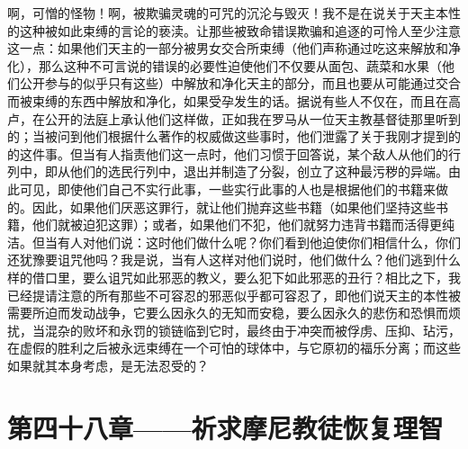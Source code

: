啊，可憎的怪物！啊，被欺骗灵魂的可咒的沉沦与毁灭！我不是在说关于天主本性的这种被如此束缚的言论的亵渎。让那些被致命错误欺骗和追逐的可怜人至少注意这一点：如果他们天主的一部分被男女交合所束缚（他们声称通过吃这来解放和净化），那么这种不可言说的错误的必要性迫使他们不仅要从面包、蔬菜和水果（他们公开参与的似乎只有这些）中解放和净化天主的部分，而且也要从可能通过交合而被束缚的东西中解放和净化，如果受孕发生的话。据说有些人不仅在，而且在高卢，在公开的法庭上承认他们这样做，正如我在罗马从一位天主教基督徒那里听到的；当被问到他们根据什么著作的权威做这些事时，他们泄露了关于我刚才提到的的这件事。但当有人指责他们这一点时，他们习惯于回答说，某个敌人从他们的行列中，即从他们的选民行列中，退出并制造了分裂，创立了这种最污秽的异端。由此可见，即使他们自己不实行此事，一些实行此事的人也是根据他们的书籍来做的。因此，如果他们厌恶这罪行，就让他们抛弃这些书籍（如果他们坚持这些书籍，他们就被迫犯这罪）；或者，如果他们不犯，他们就努力违背书籍而活得更纯洁。但当有人对他们说：这时他们做什么呢？你们看到他迫使你们相信什么，你们还犹豫要诅咒他吗？我是说，当有人这样对他们说时，他们做什么？他们逃到什么样的借口里，要么诅咒如此邪恶的教义，要么犯下如此邪恶的丑行？相比之下，我已经提请注意的所有那些不可容忍的邪恶似乎都可容忍了，即他们说天主的本性被需要所迫而发动战争，它要么因永久的无知而安稳，要么因永久的悲伤和恐惧而烦扰，当混杂的败坏和永罚的锁链临到它时，最终由于冲突而被俘虏、压抑、玷污，在虚假的胜利之后被永远束缚在一个可怕的球体中，与它原初的福乐分离；而这些如果就其本身考虑，是无法忍受的？\par


\section{第四十八章——祈求摩尼教徒恢复理智}

